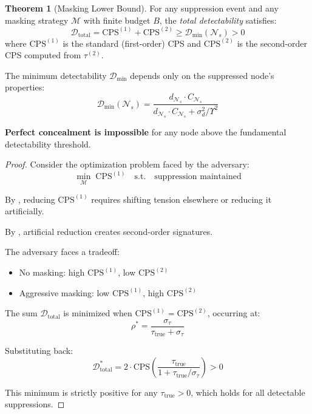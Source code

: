 \documentclass[12pt,a4paper]{article}
\theoremstyle{definition}
\newtheorem{theorem}{Theorem}[section]
\theoremstyle{remark}
\newcommand{\NS}{\mathcal{N}_s}          %
\newcommand{\Yharim}{\Upsilon}           %
\begin{document}
\begin{theorem}[Masking Lower Bound]
\label{thm:impossibility}
For any suppression event and any masking strategy $\mathcal{M}$ with finite budget $B$, the \emph{total detectability} satisfies:
\begin{equation}
    \boxed{
    \mathcal{D}_{\text{total}} = \text{CPS}^{(1)} + \text{CPS}^{(2)} \geq \mathcal{D}_{\min}(\NS) > 0
    }
\end{equation}
where $\text{CPS}^{(1)}$ is the standard (first-order) CPS and $\text{CPS}^{(2)}$ is the second-order CPS computed from $\tau^{(2)}$.

The minimum detectability $\mathcal{D}_{\min}$ depends only on the suppressed node's properties:
\begin{equation}
    \mathcal{D}_{\min}(\NS) = \frac{d_{\NS} \cdot C_{\NS}}{d_{\NS} \cdot C_{\NS} + \sigma_d^2 / \Yharim^2}
\end{equation}

\textbf{Perfect concealment is impossible} for any node above the fundamental detectability threshold.
\end{theorem}

\begin{proof}
Consider the optimization problem faced by the adversary:
\begin{equation}
    \min_{\mathcal{M}} \; \text{CPS}^{(1)} \quad \text{s.t.} \quad \text{suppression maintained}
\end{equation}

By , reducing $\text{CPS}^{(1)}$ requires shifting tension elsewhere or reducing it artificially.

By , artificial reduction creates second-order signatures.

The adversary faces a tradeoff:
\begin{itemize}
    \item No masking: high $\text{CPS}^{(1)}$, low $\text{CPS}^{(2)}$
    \item Aggressive masking: low $\text{CPS}^{(1)}$, high $\text{CPS}^{(2)}$
\end{itemize}

The sum $\mathcal{D}_{\text{total}}$ is minimized when $\text{CPS}^{(1)} = \text{CPS}^{(2)}$, occurring at:
\begin{equation}
    \rho^* = \frac{\sigma_\tau}{\tau_{\text{true}} + \sigma_\tau}
\end{equation}

Substituting back:
\begin{equation}
    \mathcal{D}_{\text{total}}^* = 2 \cdot \text{CPS}\left( \frac{\tau_{\text{true}}}{1 + \tau_{\text{true}}/\sigma_\tau} \right) > 0
\end{equation}

This minimum is strictly positive for any $\tau_{\text{true}} > 0$, which holds for all detectable suppressions.
\end{proof}
\end{document}
